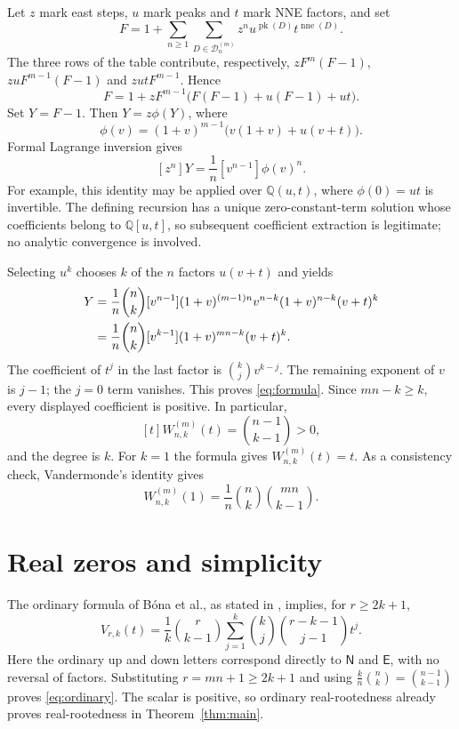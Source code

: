 \documentclass[11pt]{article}
\DeclareMathOperator{\pk}{pk}
\DeclareMathOperator{\nne}{nne}
\newcommand{\N}{\mathsf{N}}
\newcommand{\E}{\mathsf{E}}
\newcommand{\W}{W^{(m)}_{n,k}}
\begin{document}
Let $z$ mark east steps, $u$ mark peaks and $t$ mark NNE factors, and set
\[
 F=1+\sum_{n\geq1}\sum_{D\in\mathcal D^{(m)}_n}
            z^n u^{\pk(D)}t^{\nne(D)}.
\]
The three rows of the table contribute, respectively,
$zF^m(F-1)$, $zuF^{m-1}(F-1)$ and $zutF^{m-1}$. Hence
\begin{equation}\label{eq:F}
 F=1+zF^{m-1}\bigl(F(F-1)+u(F-1)+ut\bigr).
\end{equation}
Set $Y=F-1$. Then $Y=z\phi(Y)$, where
\[
 \phi(v)=(1+v)^{m-1}\bigl(v(1+v)+u(v+t)\bigr).
\]
Formal Lagrange inversion \cite[Section~2.1]{Gessel2016} gives
\[
 [z^n]Y=\frac1n[v^{n-1}]\phi(v)^n.
\]
For example, this identity may be applied over $\mathbb Q(u,t)$, where
$\phi(0)=ut$ is invertible. The defining recursion has a unique
zero-constant-term solution whose coefficients belong to
$\mathbb Q[u,t]$, so subsequent coefficient extraction is legitimate;
no analytic convergence is involved.

Selecting $u^k$ chooses $k$ of the $n$ factors $u(v+t)$ and yields
\begin{align}
 [z^nu^k]Y
 &=\frac1n\binom nk[v^{n-1}]
       (1+v)^{(m-1)n}v^{n-k}(1+v)^{n-k}(v+t)^k\notag\\
 &=\frac1n\binom nk[v^{k-1}](1+v)^{mn-k}(v+t)^k.\label{eq:extraction}
\end{align}
The coefficient of $t^j$ in the last factor is $\binom kj v^{k-j}$.
The remaining exponent of $v$ is $j-1$; the $j=0$ term vanishes.
This proves \eqref{eq:formula}. Since $mn-k\geq k$, every displayed
coefficient is positive. In particular,
\[
 [t]\W(t)=\binom{n-1}{k-1}>0,
\]
and the degree is $k$. For $k=1$ the formula gives $\W(t)=t$.
As a consistency check, Vandermonde's identity gives
\[
 \W(1)=\frac1n\binom nk\binom{mn}{k-1}.
\]

\section{Real zeros and simplicity}

The ordinary formula of B\'ona et al., as stated in
\cite[Theorem~1]{WangZhang2024}, implies, for $r\geq2k+1$,
\[
 V_{r,k}(t)=\frac1k\binom r{k-1}
                \sum_{j=1}^k\binom kj\binom{r-k-1}{j-1}t^j.
\]
Here the ordinary up and down letters correspond directly to $\N$ and
$\E$, with no reversal of factors. Substituting $r=mn+1\geq2k+1$
and using $\frac{k}{n}\binom nk=\binom{n-1}{k-1}$ proves
\eqref{eq:ordinary}. The scalar is positive, so ordinary real-rootedness
\cite[Theorem~27]{BonaEtAl2025} already proves real-rootedness in
Theorem~\ref{thm:main}.
\end{document}
